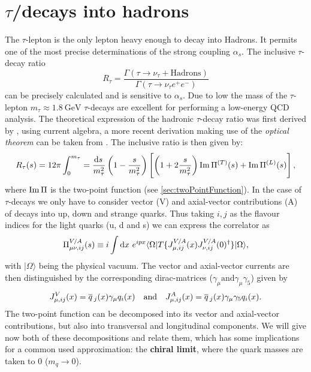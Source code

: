 \documentclass[../../index.tex]{subfiles}
\begin{document}
\section{$\tau$\-/decays into hadrons}
The $\tau$-lepton is the only lepton heavy enough to decay into Hadrons. It
permits one of the most precise determinations of the strong coupling $\alpha_s$.
The inclusive $\tau$-decay ratio
\begin{equation}
  \label{eq:inclusiveRatio}
  R_\tau = \frac{\Gamma(\tau \to \nu_\tau + \text{Hadrons})}{\Gamma(\tau \to \nu_\tau e^+ e^-)}
\end{equation}
can be precisely calculated and is sensitive to $\alpha_s$. Due to low the mass of
the $\tau$-lepton $m_\tau\approx\SI{1.8}{\giga\eV}$ $\tau$-decays are excellent
for performing a low-energy QCD analysis.
The theoretical expression of the hadronic $\tau$-decay ratio was first derived
by \cite{Tsai1971}, using current algebra, a more recent derivation making use
of the \textit{optical theorem} can be taken from \cite{Schwab2002}. The
inclusive ratio is then given by:
\begin{equation}
  \label{eq:hadronicTauDecayRatio}
  R_\tau(s) = 12 \pi \int_0^{m_\tau} = \frac{\dif s}{m_\tau^2}
  \left( 1 - \frac{s}{m_\tau^2} \right)
  \left[ \left( 1 + 2 \frac{s}{m_\tau^2} \right) \Ima \Pi^{(T)}(s) + \Ima \Pi^{(L)}(s) \right],
\end{equation}
where $\operatorname{Im} \Pi$ is the two-point function (see \cref{sec:twoPointFunction}). In
the case of $\tau$-decays we only have to consider vector (V) and axial-vector
contributions (A) of decays into up, down and strange quarks. Thus taking $i,j$ as the flavour
indices for the light quarks (u, d and s) we can express the correlator as
\begin{equation}
  \Pi_{\mu\nu,ij}^{V/A}(s) \equiv i \int \dif x \,e^{ipx} \langle \Omega | T \{ J_{\mu,ij}^{V/A}(x) J_{\nu,ij}^{V/A}(0)^\dagger \} | \Omega \rangle,
\end{equation}
with $|\Omega\rangle$ being the physical vacuum. The vector and axial-vector
currents are then distinguished by the corresponding dirac-matrices
($\gamma_\mu \text{and} \gamma_\mu \gamma_5$) given by
\begin{equation}
  J_{\mu,ij}^{V}(x) = \overline{q}\,_j(x) \gamma_\mu q_i(x) \quad \text{and} \quad J_{\mu,ij}^{A}(x) = \overline{q}\,_j(x) \gamma_\mu \gamma_5 q_i(x).
\end{equation}
The two-point function can be decomposed into its vector and axial-vector
contributions, but also into transversal and longitudinal components. We will
give now both of these decompositions and relate them, which has some
implications for a common used approximation: the \textbf{chiral limit}, where
the quark masses are taken to 0 ($m_q \to 0$).
\end{document}
